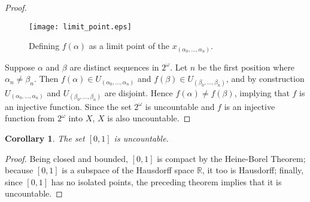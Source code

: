 \documentclass[12pt]{article}
\newtheorem*{corollary*}{Corollary}
\begin{document}
\begin{proof}
\begin{figure}[hh]
\begin{centering}  
\texttt{[image: limit\_point.eps]}
\caption{Defining $f(\alpha)$ as a limit point of the $x_{(\alpha_0,\dots,\alpha_n)}$.}
\end{centering}
\end{figure}

Suppose $\alpha$ and $\beta$ are distinct sequences in $2^{\omega}$.  Let $n$ be the first position where $\alpha_n\ne\beta_n$.  Then $f(\alpha)\in U_{(\alpha_0,\dots,\alpha_n)}$ and $f(\beta)\in U_{(\beta_0,\dots,\beta_n)}$, and by construction $U_{(\alpha_0,\dots,\alpha_n)}$ and $U_{(\beta_0,\dots,\beta_n)}$ are disjoint.  Hence $f(\alpha)\ne f(\beta)$, implying that $f$ is an injective function.  Since the set $2^{\omega}$ is uncountable and $f$ is an injective function from $2^{\omega}$ into $X$, $X$ is also uncountable.
\end{proof}

\begin{corollary*}
The set $[0,1]$ is uncountable.
\end{corollary*}
\begin{proof}
Being closed and bounded, $[0,1]$ is compact by the Heine-Borel Theorem; because $[0,1]$ is a 
subspace of the Hausdorff space $\mathbb{R}$, it too is Hausdorff; finally, since $[0,1]$ has no isolated points, the preceding theorem implies that it is uncountable.
\end{proof}


\end{document}
